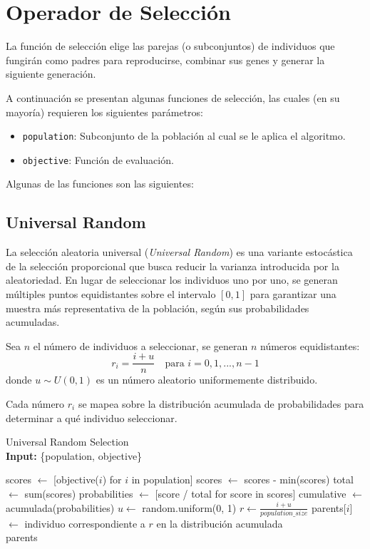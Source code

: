 \chapter{Operador de Selección}

La función de selección elige las parejas (o subconjuntos) de individuos que fungirán como padres para reproducirse, combinar sus genes y generar la siguiente generación.

A continuación se presentan algunas funciones de selección, las cuales (en su mayoría) requieren los siguientes parámetros:
\begin{itemize}
	\item \texttt{population}: Subconjunto de la población al cual se le aplica el algoritmo.
	\item \texttt{objective}: Función de evaluación.
\end{itemize}

Algunas de las funciones son las siguientes:

\section{Universal Random}

La selección aleatoria universal (\textit{Universal Random}) es una variante estocástica de la selección proporcional que busca reducir la varianza introducida por la aleatoriedad. En lugar de seleccionar los individuos uno por uno, se generan múltiples puntos equidistantes sobre el intervalo $[0,1]$ para garantizar una muestra más representativa de la población, según sus probabilidades acumuladas.

Sea $n$ el número de individuos a seleccionar, se generan $n$ números equidistantes:
\[
r_i = \frac{i + u}{n} \quad \text{para } i = 0, 1, ..., n-1
\]
donde $u \sim U(0,1)$ es un número aleatorio uniformemente distribuido.

Cada número $r_i$ se mapea sobre la distribución acumulada de probabilidades para determinar a qué individuo seleccionar.

\begin{algorithm}[H]
	\caption{Universal Random Selection \\ \textbf{Input:} \{population, objective\}}
	\begin{algorithmic}[1]
		\State scores $\gets$ [objective($i$) for $i$ in population]
		\State scores $\gets$ scores - min(scores) 
		\EndIf
		\State total $\gets$ sum(scores)
		\State probabilities $\gets$ [score / total for score in scores]
		\State cumulative $\gets$ acumulada(probabilities)
		\State $u \gets$ random.uniform(0, 1)
		\State $r \gets \frac{i + u}{population\_size}$
		\State parents[$i$] $\gets$ individuo correspondiente a $r$ en la distribución acumulada
		\EndFor \\
		\Return parents
	\end{algorithmic}
	\label{alg:universal_random}
\end{algorithm}

